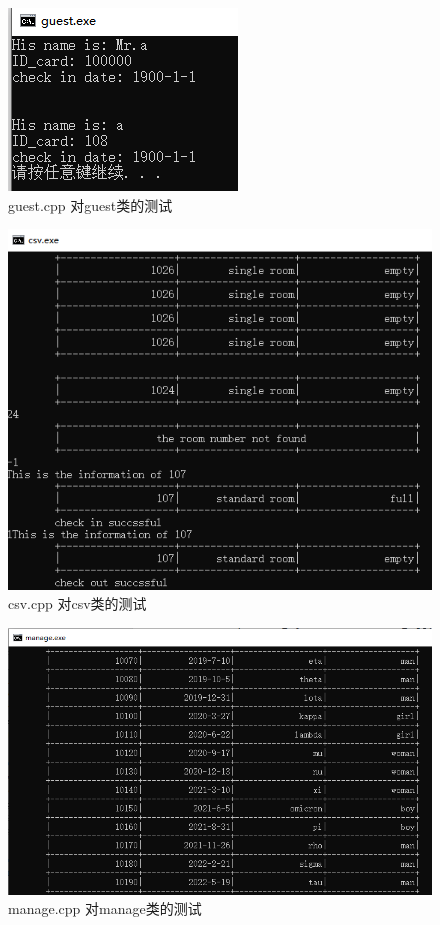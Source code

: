 \documentclass[UTF8]{ctexart}
\begin{document}
  \begin{figure}[H]
      \centering
      \includegraphics[scale=1]{test_guest}
      \caption{guest.cpp 对guest类的测试}
      \label{fig:test_guest}
    \end{figure}
  \begin{figure}[H]
      \centering
      \includegraphics[scale=0.4]{test_csv}
      \caption{csv.cpp 对csv类的测试}
      \label{fig:test_csv}
    \end{figure}
  \begin{figure}[H]
      \centering
      \includegraphics[scale=0.4]{test_manage}
      \caption{manage.cpp 对manage类的测试}
      \label{fig:test_manage}
    \end{figure}
\end{document}
